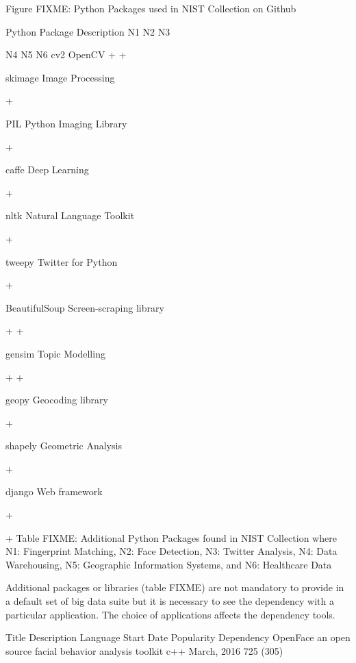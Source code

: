 \documentclass[9pt,twocolumn,twoside]{styles/osajnl}
\begin{document}
Figure FIXME: Python Packages used in NIST Collection on Github

Python Package
	Description
	N1
	N2
	N3

	N4
	N5
	N6
	cv2
	OpenCV
	+
	+
	 
	 
	 
	 
	skimage
	Image Processing
	 
	+
	 
	 
	 
	 
	PIL
	Python Imaging Library
	 
	+
	 
	 
	 
	 
	caffe
	Deep Learning
	 
	+
	 
	 
	 
	 
	nltk
	Natural Language Toolkit
	 
	 
	+
	 
	 
	 
	tweepy
	Twitter for Python
	 
	 
	+
	 
	 
	 
	BeautifulSoup
	Screen-scraping library
	 
	 
	+
	+
	 
	 
	gensim
	Topic Modelling
	 
	 
	+
	+
	 
	 
	geopy
	Geocoding library
	 
	 
	 
	 
	+
	 
	shapely
	Geometric Analysis
	 
	 
	 
	 
	+
	 
	django
	Web framework
	 
	 
	 
	+
	 
	+
	Table FIXME: Additional Python Packages found in NIST
        Collection where N1: Fingerprint Matching, N2: Face Detection,
        N3: Twitter Analysis, N4: Data Warehousing, N5: Geographic
        Information Systems, and N6: Healthcare Data



Additional packages or libraries (table FIXME) are not mandatory to provide in a default set of big data suite but it is necessary to see the dependency with a particular application. The choice of applications affects the dependency tools.


Title
	Description
	Language
	Start Date
	Popularity
	Dependency
	OpenFace
	an  open  source  facial   behavior analysis toolkit
	c++
	March, 2016
	725 (305)
\end{document}
